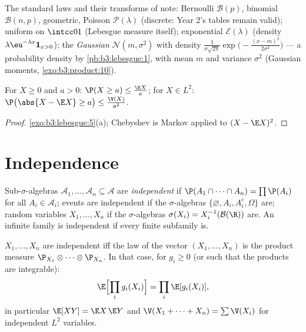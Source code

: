 \begin{example}\label{ex:b3:probability:laws}
The standard laws and their transforms of note: Bernoulli
$\mathcal B(p)$, binomial $\mathcal B(n, p)$, geometric,
Poisson $\mathcal P(\lambda)$ (discrete: Year 2's tables
remain valid); uniform on $\intcc01$ (Lebesgue measure
itself); exponential $\mathcal E(\lambda)$ (density
$\lambda\eu^{-\lambda x}\mathbf 1_{x>0}$); the
\emph{Gaussian} $\mathcal N(m, \sigma^2)$
with density $\frac1{\sigma\sqrt{2\pi}}\exp\bigl(-\frac{(x -
m)^2}{2\sigma^2}\bigr)$ --- a probability density by
\cref{pb:b3:lebesgue:1}, with mean $m$ and variance
$\sigma^2$ (Gaussian moments, \cref{exo:b3:product:10}).
\end{example}

\begin{proposition}
\label{prop:b3:probability:markov}
For $X \geq 0$ and $a > 0$: $\P(X \geq a) \leq \frac{\E
X}{a}$; for $X \in L^2$: $\P\bigl(\abs{X - \E X} \geq
a\bigr) \leq \frac{\V(X)}{a^2}$.
\end{proposition}

\begin{proof}
\cref{exo:b3:lebesgue:5}(a); Chebyshev is Markov applied to
$(X - \E X)^2$.
\end{proof}

\section{Independence}

\begin{definition}\label{def:b3:probability:independence}
Sub-$\sigma$-algebras $\mathcal A_1, \dots, \mathcal A_n
\subseteq \mathcal A$ are \emph{independent}
if $\P(A_1\cap\dots\cap A_n) = \prod\P(A_i)$ for all $A_i \in
\mathcal A_i$; events are independent if the $\sigma$-algebras
$\{\varnothing, A_i, A_i^c, \Omega\}$ are; random variables
$X_1, \dots, X_n$ if the $\sigma$-algebras $\sigma(X_i) =
X_i^{-1}(\mathcal B(\R))$ are. An infinite family is
independent if every finite subfamily is.
\end{definition}

\begin{theorem}\label{thm:b3:probability:independence}
$X_1, \dots, X_n$ are independent iff the law of the vector
$(X_1, \dots, X_n)$ is the product measure
$\P_{X_1}\otimes\cdots\otimes\P_{X_n}$. In that case, for
$g_i \geq 0$ (or such that the products are integrable):
\[
\E\Bigl[\prod_ig_i(X_i)\Bigr] = \prod_i\E[g_i(X_i)],
\]
in particular $\E[XY] = \E X\,\E Y$ and $\V(X_1 + \dots +
X_n) = \sum\V(X_i)$ for independent $L^2$ variables.
\end{theorem}

